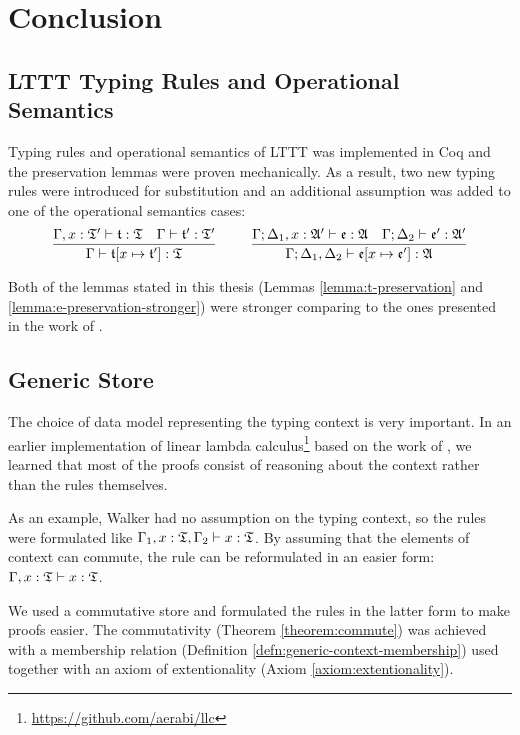 \chapter{Conclusion}\label{chap:conclusion}

\section{LTTT Typing Rules and Operational Semantics}

Typing rules and operational semantics of LTTT was implemented in Coq and the preservation lemmas were proven mechanically. As a result, two new typing rules were introduced for substitution and an additional assumption was added to one of the operational semantics cases:
\[
\infer{\Gamma \vdash \t[x \mapsto \t'] : \T}{
    \Gamma, x : \T' \vdash \t : \T
    &
    \Gamma \vdash \t' : \T'
}
~~~~ ~~~~
\infer{\Gamma; \Delta_1, \Delta_2 \vdash \e[x \mapsto \e'] : \A}{
    \Gamma; \Delta_1, x : \A' \vdash \e : \A
    &
    \Gamma; \Delta_2 \vdash \e' : \A'
}
\]

Both of the lemmas stated in this thesis (Lemmas \ref{lemma:t-preservation} and \ref{lemma:e-preservation-stronger}) were stronger comparing to the ones presented in the work of \cite{Paykin2016TheEO}.

\section{Generic Store}

The choice of data model representing the typing context is very important. In an earlier implementation of linear lambda calculus\footnote{\url{https://github.com/aerabi/llc}} based on the work of \cite{DavidWalker2004}, we learned that most of the proofs consist of reasoning about the context rather than the rules themselves.

As an example, Walker had no assumption on the typing context, so the rules were formulated like $\Gamma_1, x : \mathfrak{T}, \Gamma_2 \vdash x : \mathfrak{T}$. By assuming that the elements of context can commute, the rule can be reformulated in an easier form: $\Gamma, x : \mathfrak{T} \vdash x : \mathfrak{T}$.

We used a commutative store and formulated the rules in the latter form to make proofs easier. The commutativity (Theorem \ref{theorem:commute}) was achieved with a membership relation (Definition \ref{defn:generic-context-membership}) used together with an axiom of extentionality (Axiom \ref{axiom:extentionality}).

